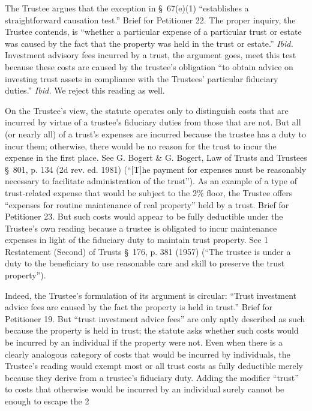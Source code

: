 
  The Trustee argues that the exception in \S~67(e)(1) ``establishes a straightforward causation test.'' Brief for Petitioner 22. The proper inquiry, the Trustee contends, is ``whether a particular expense of a particular trust or estate was caused by the fact that the property was held in the trust or estate.'' \emph{Ibid.} Investment advisory fees incurred by a trust, the argument goes, meet this test because these costs are caused by the trustee's obligation ``to obtain advice on investing trust assets in compliance with the Trustees' particular fiduciary duties.'' \emph{Ibid.} We reject this reading as well.

  On the Trustee's view, the statute operates only to distinguish costs that are incurred by virtue of a trustee's fiduciary duties from those that are not. But all (or nearly all) of a trust's expenses are incurred because the trustee has a duty to incur them; otherwise, there would be no reason for the trust to incur the expense in the first place. See G. Bogert \& G. Bogert, Law of Trusts and Trustees \S~801, p. 134 (2d rev. ed. 1981) (``[T]he payment for expenses must be reasonably necessary to facilitate administration of the trust''). As an example of a type of trust-related expense that would be subject to the 2\% floor, the Trustee offers ``expenses for routine maintenance of real property'' held by a trust. Brief for Petitioner 23. But such costs would appear to be fully deductible under the Trustee's own reading because a trustee is obligated to incur maintenance expenses in light of the fiduciary duty to maintain trust property. See 1 Re\newpage statement (Second) of Trusts \S~176, p. 381 (1957) (``The trustee is under a duty to the beneficiary to use reasonable care and skill to preserve the trust property'').

  Indeed, the Trustee's formulation of its argument is circular: ``Trust investment advice fees are caused by the fact the property is held in trust.'' Brief for Petitioner 19. But ``trust investment advice fees'' are only aptly described as such because the property is held in trust; the statute asks whether such costs would be incurred by an individual if the property were not. Even when there is a clearly analogous category of costs that would be incurred by individuals, the Trustee's reading would exempt most or all trust costs as fully deductible merely because they derive from a trustee's fiduciary duty. Adding the modifier ``trust'' to costs that otherwise would be incurred by an individual surely cannot be enough to escape the 2%

